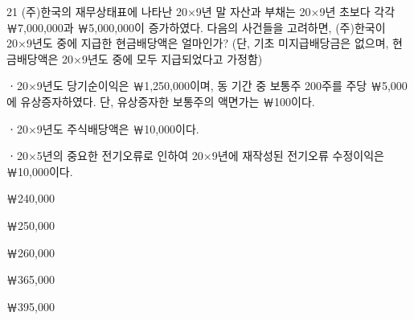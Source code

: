 \begin{question}{21}
(주)한국의 재무상태표에 나타난 20×9년 말 자산과 부채는 20×9년 초보다 각각 ￦7,000,000과 ￦5,000,000이 증가하였다. 다음의 사건들을 고려하면, (주)한국이 20×9년도 중에 지급한 현금배당액은 얼마인가? (단, 기초 미지급배당금은 없으며, 현금배당액은 20×9년도 중에 모두 지급되었다고 가정함)
\begin{framedtext}
ㆍ20×9년도 당기순이익은 ￦1,250,000이며, 동 기간 중 보통주 200주를 주당 ￦5,000에 유상증자하였다. 단, 유상증자한 보통주의 액면가는 ￦100이다. \par
ㆍ20×9년도 주식배당액은 ￦10,000이다. \par
ㆍ20×5년의 중요한 전기오류로 인하여 20×9년에 재작성된 전기오류 수정이익은 ￦10,000이다. \par
\end{framedtext}
\begin{choices}
  \item ￦240,000
  \item ￦250,000
  \item ￦260,000
  \item ￦365,000
  \item ￦395,000
\end{choices}
\end{question}
